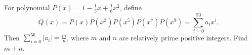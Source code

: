 For polynomial $P(x)=1-\frac{1}{3}x+\frac{1}{6}x^2$, define \[ Q(x) = P(x)P(x^3)P(x^5)P(x^7)P(x^9) = \sum\limits_{i=0}^{50}a_ix^i. \]Then $\sum\limits_{i=0}^{50}|a_i|=\frac{m}{n}$, where $m$ and $n$ are relatively prime positive integers. Find $m+n$.